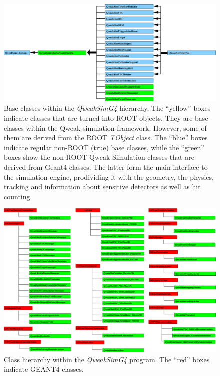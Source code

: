 \begin{figure}[h]
  \hspace{0cm}
  \includegraphics[scale=0.4]{./chapter1/figures/QweakSimClassTree04.eps}
  \caption{Base classes within the {\em QweakSimG4} hierarchy. The
           ``yellow'' boxes indicate classes that are turned into ROOT
           objects. They are base classes within the Qweak simulation
           framework. However, some of them are derived from the ROOT
           {\em TObject} class.  The ``blue'' boxes indicate regular
           non-ROOT (true) base classes, while the ``green'' boxes show the
           non-ROOT Qweak Simulation classes that are derived from Geant4
           classes. The latter form the main interface to the simulation
           engine, prodividing it with the geometry, the physics, tracking 
           and information about sensitive detectors as well as hit counting.}
           \label{fig:CLTR1}
\end{figure}

\clearpage

\begin{landscape}
\begin{figure}[h]
  \hspace{0cm}
  \includegraphics[scale=0.34]{./chapter1/figures/QweakSimClassTree01.eps}
  \caption{Class hierarchy within the {\em QweakSimG4} program. The ``red''
           boxes indicate GEANT4 classes.}
           \label{fig:CLTR2}
\end{figure}

\end{landscape}
\clearpage

